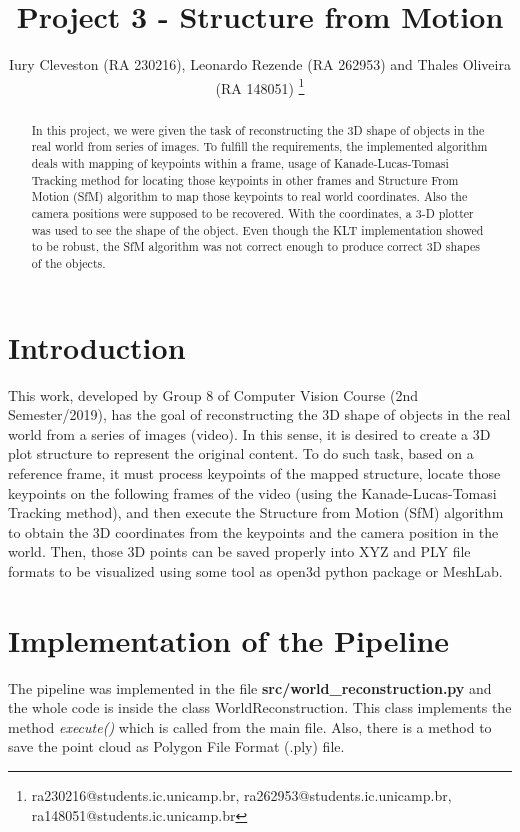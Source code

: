 \documentclass[]{IEEEtran}
\begin{document}
  \title{Project 3 - Structure from Motion}
  \author{Iury Cleveston (RA 230216), Leonardo Rezende (RA 262953) and Thales Oliveira (RA 148051)
    \thanks{ra230216@students.ic.unicamp.br, ra262953@students.ic.unicamp.br, ra148051@students.ic.unicamp.br}
  }
  \maketitle
  
  \begin{abstract}
    In this project, we were given the task of reconstructing the 3D shape of objects in the real world from series of images. To fulfill the requirements, the implemented algorithm deals with mapping of keypoints within a frame, usage of Kanade-Lucas-Tomasi Tracking method for locating those keypoints in other frames and Structure From Motion (SfM) algorithm to map those keypoints to real world coordinates. Also the camera positions were supposed to be recovered. With the coordinates, a 3-D plotter was used to see the shape of the object. Even though the KLT implementation showed to be robust, the SfM algorithm was not correct enough to produce correct 3D shapes of the objects.
  \end{abstract}
  
\section{Introduction}
This work, developed by Group 8 of Computer Vision Course (2nd Semester/2019), has the goal of reconstructing the 3D shape of objects in the real world from a series of images (video). In this sense, it is desired to create a 3D plot structure to represent the original content. To do such task, based on a reference frame, it must process keypoints of the mapped structure, locate those keypoints on the following frames of the video (using the Kanade-Lucas-Tomasi Tracking method), and then execute the Structure from Motion (SfM) algorithm to obtain the 3D coordinates from the keypoints and the camera position in the world. Then, those 3D points can be saved properly into XYZ and PLY file formats to be visualized using some tool as open3d python package or MeshLab.

\section{Implementation of the Pipeline}

The pipeline was implemented in the file \textbf{src/world\_reconstruction.py} and the whole code is inside the class WorldReconstruction. This class implements the method \textit{execute()} which is called from the main file. Also, there is a method to save the point cloud as Polygon File Format (.ply) file. 
\end{document}
